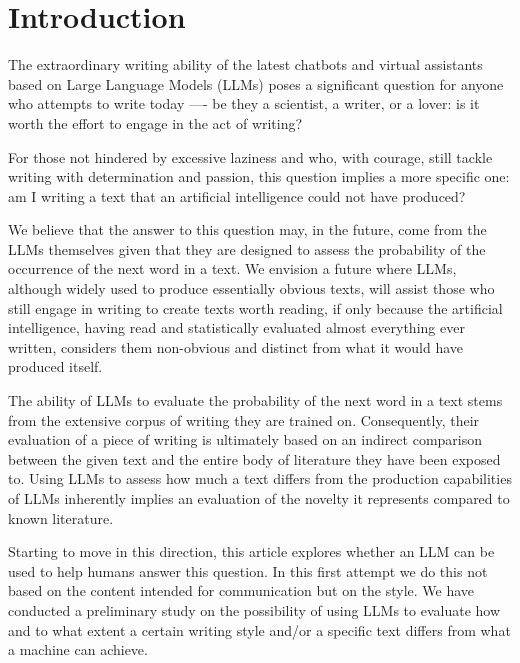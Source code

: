 \documentclass[
twocolumn,
]{ceurart}
\begin{document}
\maketitle


\section{Introduction}

The extraordinary writing ability of the latest chatbots and virtual assistants based on Large Language Models (LLMs) poses a significant question for anyone who attempts to write today —- be they a scientist, a writer, or a lover: is it worth the effort to engage in the act of writing?

For those not hindered by excessive laziness and who, with courage, still tackle writing with determination and passion, this question implies a more specific one: am I writing a text that an artificial intelligence could not have produced?

We believe that the answer to this question may, in the future, come from the LLMs themselves given that they are designed to assess the probability of the occurrence of the next word in a text. 
We envision a future where LLMs, although widely used to produce essentially obvious texts, will assist those who still engage in writing to create texts worth reading, if only because the artificial intelligence, having read and statistically evaluated almost everything ever written, considers them non-obvious and distinct from what it would have produced itself.

The ability of LLMs to evaluate the probability of the next word in a text stems from the extensive corpus of writing they are trained on. 
Consequently, their evaluation of a piece of writing is ultimately based on an indirect comparison between the given text and the entire body of literature they have been exposed to. 
Using LLMs to assess how much a text differs from the production capabilities of LLMs inherently implies an evaluation of the novelty it represents compared to known literature.

Starting to move in this direction, this article explores whether an LLM can be used to help humans answer this question. 
In this first attempt we do this not based on the content intended for communication but on the style. 
We have conducted a preliminary study on the possibility of using LLMs to evaluate how and to what extent a certain writing style and/or a specific text differs from what a machine can achieve.
\end{document}
